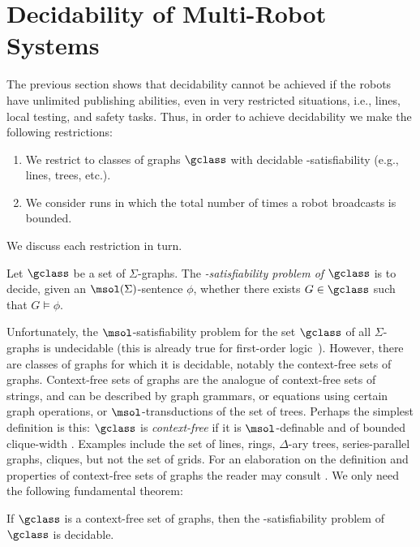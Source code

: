 
\section{Decidability of Multi-Robot Systems} \label{sec:dec}
The previous section shows that decidability cannot be achieved if the robots have unlimited publishing abilities, even in very restricted situations, i.e., lines, local testing, and safety tasks. Thus, in order to achieve decidability we make the following restrictions:
\begin{enumerate}
 \item We restrict to classes of graphs $\gclass$ with decidable \msol-satisfiability (e.g., lines, trees, etc.).

 \item We consider runs in which the total number of times a robot broadcasts is bounded.
\end{enumerate}

We discuss each restriction in turn. 

\begin{definition} 
 Let $\gclass$ be a set of $\Sigma$-graphs. The {\em \msol-satisfiability problem of $\gclass$} is to decide, given an $\msol(\Sigma)$-sentence $\phi$, whether there exists $G \in \gclass$ such that $G \models \phi$. 
\end{definition}

Unfortunately, the $\msol$-satisfiability problem for the set $\gclass$ of all $\Sigma$-graphs is undecidable (this is already true for first-order logic~\cite{EbFl95}). However, there are classes of graphs for which it is decidable, notably the context-free sets of graphs. 
Context-free sets of graphs are the analogue of context-free sets of strings, and can be described by graph grammars, or equations using certain graph operations, or $\msol$-transductions of the set of trees. Perhaps the simplest definition is this: $\gclass$ is {\em context-free} if it is $\msol$-definable and of bounded clique-width \cite{CE12}. Examples include the set of lines, rings, $\Delta$-ary trees, series-parallel graphs, cliques, but not the set of  grids. 
For an elaboration on the definition and properties of context-free sets of graphs the reader may consult \cite{CE12}. We only need the following fundamental theorem:

\begin{theorem} \label{thm:courcelle}
If $\gclass$ is a context-free set of graphs, then the \msol-satisfiability problem of $\gclass$ is decidable.
\end{theorem}


